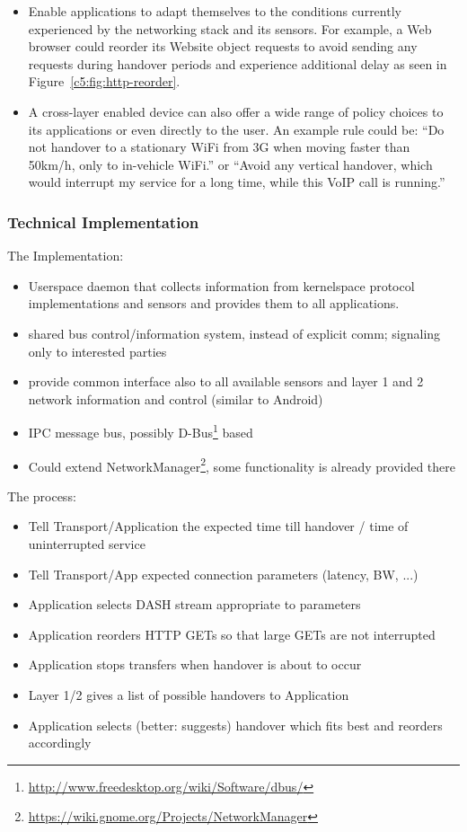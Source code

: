 \begin{itemize}
	\item Enable applications to adapt themselves to the conditions currently experienced by the networking stack and its sensors. For example, a Web browser could reorder its Website object requests to avoid sending any requests during handover periods and experience additional delay as seen in Figure~\ref{c5:fig:http-reorder}.

	\item A cross-layer enabled device can also offer a wide range of policy choices to its applications or even directly to the user. An example rule could be: ``Do not handover to a stationary WiFi from 3G when moving faster than 50km/h, only to in-vehicle WiFi.'' or ``Avoid any vertical handover, which would interrupt my service for a long time, while this VoIP call is running.''

\end{itemize}

\subsubsection{Technical Implementation}

The Implementation:
\begin{itemize}
	\item Userspace daemon that collects information from kernelspace protocol implementations and sensors and provides them to all applications.
	\item shared bus control/information system, instead of explicit comm; signaling only to interested parties
	\item provide common interface also to all available sensors and layer 1 and 2 network information and control (similar to Android)
	\item IPC message bus, possibly D-Bus\footnote{\url{http://www.freedesktop.org/wiki/Software/dbus/}} based
	\item Could extend NetworkManager\footnote{\url{https://wiki.gnome.org/Projects/NetworkManager}}, some functionality is already provided there

\end{itemize}

The process:
\begin{itemize}
\item Tell Transport/Application the expected time till handover / time of uninterrupted service
\item Tell Transport/App expected connection parameters (latency, BW, ...)
\item Application selects \gls{DASH} stream appropriate to parameters
\item Application reorders \gls{HTTP} GETs so that large GETs are not interrupted
\item Application stops transfers when handover is about to occur
\item Layer 1/2 gives a list of possible handovers to Application
\item Application selects (better: suggests) handover which fits best and reorders accordingly
\end{itemize}


